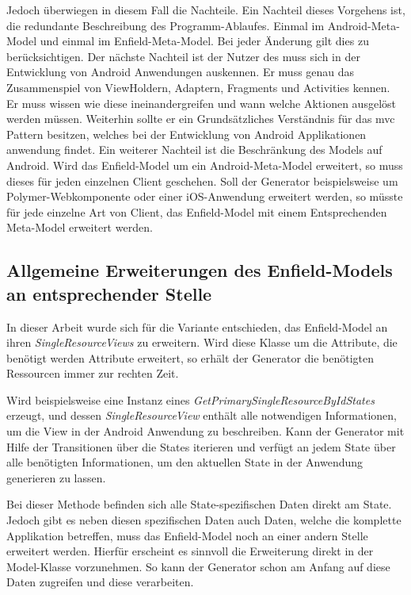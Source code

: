 Jedoch überwiegen in diesem Fall die Nachteile. Ein Nachteil dieses Vorgehens ist, die redundante Beschreibung des Programm-Ablaufes. Einmal im Android-Meta-Model und einmal im Enfield-Meta-Model. Bei jeder Änderung gilt dies zu berücksichtigen. 
Der nächste Nachteil ist der Nutzer des muss sich in der Entwicklung von Android Anwendungen auskennen. Er muss genau das Zusammenspiel von ViewHoldern, Adaptern, Fragments und Activities kennen. Er muss wissen wie diese ineinandergreifen und wann welche Aktionen ausgelöst werden müssen. Weiterhin sollte er ein Grundsätzliches Verständnis für das \acf{mvc} Pattern besitzen, welches bei der Entwicklung von Android Applikationen anwendung findet.
Ein weiterer Nachteil ist die Beschränkung des Models auf Android. Wird das Enfield-Model um ein Android-Meta-Model erweitert, so muss dieses für jeden einzelnen Client geschehen. Soll der Generator beispielsweise um Polymer-Webkomponente oder einer iOS-Anwendung erweitert werden, so müsste für jede einzelne Art von Client, das Enfield-Model mit einem Entsprechenden Meta-Model erweitert werden.

\subsection{Allgemeine Erweiterungen des Enfield-Models an entsprechender Stelle}

In dieser Arbeit wurde sich für die Variante entschieden, das Enfield-Model an ihren \textit{SingleResourceViews} zu erweitern.
Wird diese Klasse um die  Attribute, die benötigt werden Attribute erweitert, so erhält der Generator die benötigten Ressourcen immer zur rechten Zeit.

Wird beispielsweise eine Instanz eines \textit{GetPrimarySingleResourceByIdStates} erzeugt, und dessen \textit{SingleResourceView} enthält alle notwendigen Informationen, um die View in der Android Anwendung zu beschreiben. Kann der Generator mit Hilfe der Transitionen über die States iterieren und verfügt an jedem State über alle benötigten Informationen, um den aktuellen State in der Anwendung generieren zu lassen.

Bei dieser Methode befinden sich alle State-spezifischen Daten direkt am State. Jedoch gibt es neben diesen spezifischen Daten auch Daten, welche die komplette Applikation betreffen, muss das Enfield-Model noch an einer andern Stelle erweitert werden. 
Hierfür erscheint es sinnvoll die Erweiterung direkt in der Model-Klasse vorzunehmen. So kann der Generator schon am Anfang auf diese Daten zugreifen und diese verarbeiten.

